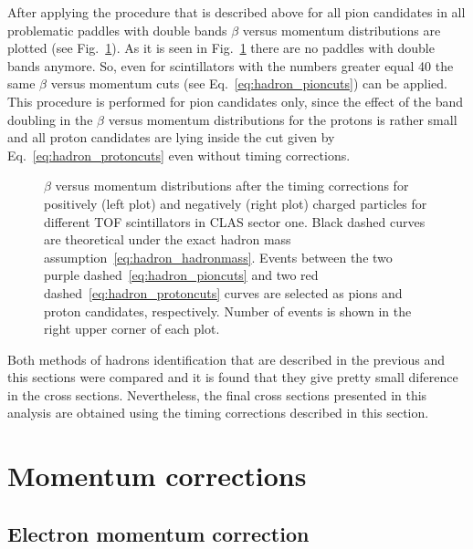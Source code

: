After applying the procedure that is described above for all pion candidates in all problematic paddles with double bands $\beta$ versus momentum distributions are plotted (see Fig.~\ref{fig:b_vs_p_time_corr}). 
As it is seen in Fig.~\ref{fig:b_vs_p_time_corr} there are no paddles with double bands anymore. So, even for scintillators with the numbers greater equal 40 the same $\beta$ versus momentum cuts (see Eq.~\ref{eq:hadron_pioncuts}) can be applied. This procedure is performed for pion candidates only, since the effect of the band doubling in the $\beta$ versus momentum distributions  for the protons is rather small and all proton candidates are lying inside the cut given by Eq.~\ref{eq:hadron_protoncuts} even without timing corrections.

\begin{figure}[htp]
\begin{center}
\caption{\small  $\beta$ versus momentum distributions after the timing corrections for positively (left plot) and negatively (right plot) charged particles for different TOF scintillators in CLAS sector one. Black dashed curves are theoretical under the exact hadron mass assumption~\ref{eq:hadron_hadronmass}. Events between the two purple dashed~\ref{eq:hadron_pioncuts} and two red dashed~\ref{eq:hadron_protoncuts} curves are selected as pions and proton candidates, respectively. Number of events is shown in the right upper corner of each plot. \label{fig:b_vs_p_time_corr}} 
\end{center}
\end{figure}

Both methods of hadrons identification that are described in the previous and this sections were compared and it is found that they give pretty small diference in the cross sections.
Nevertheless, the final cross sections presented in this analysis are obtained using the timing corrections described in this section. 

\section{Momentum corrections}
\label{momcorr}



\subsection{Electron momentum correction}
\label{electronmomcor}

